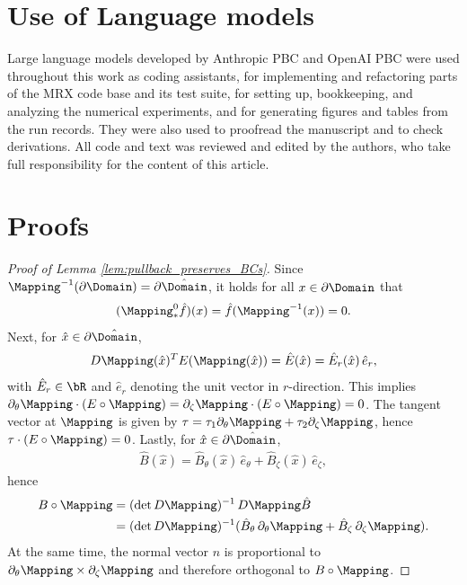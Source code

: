 \documentclass[%
 reprint,
 superscriptaddress,
 amsmath,amssymb,
 aps, nofootinbib, floatfix]{revtex4-2}
\begin{document}
\section*{Use of Language models}
Large language models developed by Anthropic PBC and OpenAI PBC were used throughout this work as coding assistants, for implementing and refactoring parts of the MRX code base and its test suite, for setting up,  bookkeeping, and analyzing the numerical experiments, and for generating figures and tables from the run records. 
%
They were also used to proofread the manuscript and to check derivations. 
%
All code and text was reviewed and edited by the authors, who take full responsibility for the content of this article.

\appendix

\section{Proofs}
\label{sec:proofs}

\begin{proof}[Proof of Lemma \ref{lem:pullback_preserves_BCs}]
    Since $\Mapping^{-1}(\partial \Domain) = \partial \hat \Domain$, it holds for all $x\in\partial \Domain$ that
    \begin{align}
    (\Mapping^0_* \hat f)(x) = \hat f(\Mapping^{-1}(x)) = 0.   
    \end{align}
    Next, for $\hat x\in\partial \hat \Domain$,   
    \begin{align}
    D\Mapping(\hat x)^T E(\Mapping(\hat x)) = \hat E(\hat x) = \hat E_r(\hat x) \, \hat e_r,   
    \end{align}
    with $\hat E_r \in \bR$ and $\hat e_r$ denoting the unit vector in $r$-direction. This implies $\partial_\theta \Mapping \cdot (E \circ \Mapping) = \partial_\zeta \Mapping \cdot (E \circ \Mapping) = 0$. The tangent vector at $\Mapping$ is given by $\tau = \tau_1 \partial_\theta \Mapping + \tau_2 \partial_\zeta \Mapping$, hence $\tau \cdot (E \circ \Mapping) = 0$.   
%
    Lastly, for $\hat x\in\partial \hat \Domain$,   
    \begin{align}
        \hat B(\hat x) = \hat B_\theta(\hat x) \, \hat e_\theta + \hat B_\zeta(\hat x) \, \hat e_\zeta,   
    \end{align} 
    hence 
    \begin{align}
    B \circ \Mapping &= (\det D\Mapping)^{-1} \, D\Mapping \hat B \notag \\ 
    &= (\det D\Mapping)^{-1} ( \hat B_\theta \, \partial_\theta \Mapping + \hat B_\zeta \, \partial_\zeta \Mapping).   
    \end{align}
    At the same time, the normal vector $n$ is proportional to $\partial_\theta \Mapping \times \partial_\zeta \Mapping$ and therefore orthogonal to $B \circ \Mapping$.
\end{proof}
\end{document}

